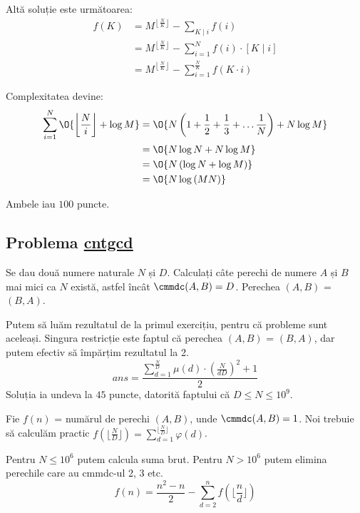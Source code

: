 Altă soluție este următoarea: 
\begin{align*}
    f(K) &= M^{\left\lfloor \frac{N}{K} \right\rfloor} - \sum_{K\mid i} f(i)\\
    &= M^{\left\lfloor \frac{N}{K} \right\rfloor} - \sum_{i=1}^{N} f(i) \cdot [K\mid i] \\
    &= M^{\left\lfloor \frac{N}{K} \right\rfloor} - \sum_{i=1}^{\frac{N}{K}} f(K \cdot i)
\end{align*}

Complexitatea devine:
\begin{align*}
    \sum_{i=1}^{N} \O{\left\lfloor \frac{N}{i} \right\rfloor + \log{M}} &= \O{N \left(1 + \frac{1}{2} + \frac{1}{3} + \dots \frac{1}{N}\right) + N \log{M}}\\
    &= \O{N \log{N} + N \log{M}}\\
    &= \O{N\left(\log{N} + \log{M}\right)}\\
    &= \O{N\log{(MN)}}
\end{align*}

Ambele iau $100$ puncte.

\subsection{Problema \href{https://kilonova.ro/problems/372}{cntgcd}}
Se dau două numere naturale $N$ și $D$. Calculați câte perechi de numere $A$ și $B$ mai mici ca $N$ există, astfel încât $\cmmdc(A,B) = D$. Perechea $(A,B)$ = $(B, A)$.

Putem să luăm rezultatul de la primul exercițiu, pentru că probleme sunt aceleași. Singura restricție este faptul că perechea $(A,B)$ = $(B,A)$, dar putem efectiv să împărțim rezultatul la 2.
\begin{equation*}
ans = \frac{\sum_{d=1}^{\frac{N}{D}} \mu(d) \cdot \left(\frac{N}{dD}\right)^2 + 1}{2}
\end{equation*}
Soluția ia undeva la $45$ puncte, datorită faptului că $D \leq N \leq 10^9$.

Fie $f(n)$ = numărul de perechi $(A,B)$, unde $\cmmdc(A,B) = 1$. Noi trebuie să calculăm practic $f(\lfloor \frac{N}{D} \rfloor ) = \sum_{d = 1}^{\lfloor \frac{N}{D} \rfloor } \varphi(d)$.

Pentru $N \leq 10^6$ putem calcula suma brut. Pentru $N > 10^6$ putem elimina perechile care au cmmdc-ul 2, 3 etc.
\begin{equation*}
    f(n) = \frac{n^2 - n}{2} - \sum_{d=2}^{n} f(\lfloor \frac{n}{d} \rfloor)
\end{equation*}

